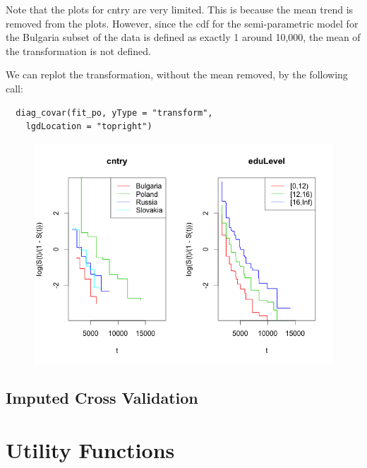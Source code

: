\documentclass[11pt]{report}
\begin{document}
  Note that the plots for cntry are very limited. This is 
  because the mean trend is removed from the plots. However,
  since the cdf for the semi-parametric model for the 
  Bulgaria subset of the data is defined as exactly 1 around 
  10,000, the mean of the transformation is not defined. 
  
  We can replot the transformation, without the mean removed,
  by the following call:
  
  \begin{verbatim}
  diag_covar(fit_po, yType = "transform",
    lgdLocation = "topright")
  \end{verbatim}

  \begin{figure}
  \includegraphics{transformPlot.png}
  \label{figure:tranformKeepMean}
  \end{figure}
  \section{Imputed Cross Validation}


\chapter{Utility Functions}
\end{document}
